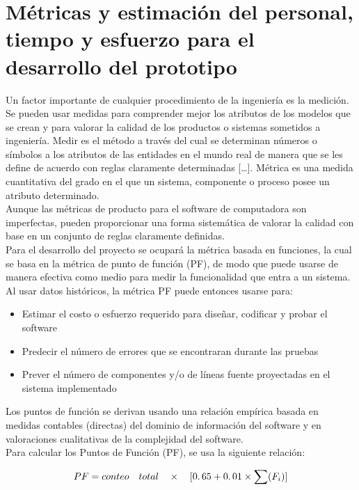 \section{Métricas y estimación del personal, tiempo y esfuerzo para el desarrollo del prototipo}

Un factor importante de cualquier procedimiento de la ingeniería es la medición. Se pueden usar medidas para comprender mejor los atributos de los modelos que se crean y para valorar la calidad de los productos o sistemas sometidos a ingeniería. Medir es el método a través del cual se determinan números o símbolos a los atributos de las entidades en el mundo real de manera que se les define de acuerdo con reglas claramente determinadas […]. Métrica es una medida cuantitativa del grado en el que un sistema, componente o proceso posee un atributo determinado. \\

Aunque las métricas de producto para el software de computadora son imperfectas, pueden proporcionar una forma sistemática de valorar la calidad con base en un conjunto de reglas claramente definidas. \\

Para el desarrollo del proyecto se ocupará la métrica basada en funciones, la cual se basa en la métrica de punto de función (PF), de modo que puede usarse de manera efectiva como medio para medir la funcionalidad que entra a un sistema. Al usar datos históricos, la métrica PF puede entonces usarse para:

\begin{itemize}
	\item Estimar el costo o esfuerzo requerido para diseñar, codificar y probar el software
	\item Predecir el número de errores que se encontraran durante las pruebas
	\item Prever el número de componentes y/o de líneas fuente proyectadas en el sistema implementado
\end{itemize}

Los puntos de función se derivan usando una relación empírica basada en medidas contables (directas) del dominio de información del software y en valoraciones cualitativas de la complejidad del software. \\

Para calcular los Puntos de Función (PF), se usa la siguiente relación:

\begin{equation}
  PF = conteo \quad total \quad \times \quad[0\ldotp65 + 0\ldotp01 \times \sum(F_i)]
\end{equation}

